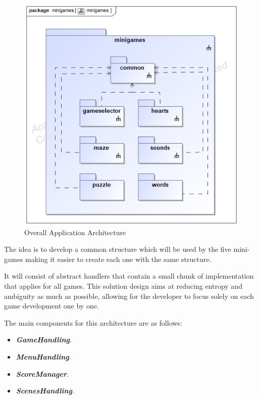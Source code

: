 \begin{figure}[H]
    \centering
    \includegraphics[scale=.5]{Chapters/arq/class__minigames__minigames.jpg}
    \caption{Overall Application Architecture}
    \label{fig:packages}
\end{figure}

The idea is to develop a common structure which will be used by the five mini-games making it easier to create each one with the same structure. 

It will consist of abstract handlers that contain a small chunk of implementation that applies for all games. This solution design aims at reducing entropy and ambiguity as much as possible, allowing for the developer to focus solely on each game development one by one.

The main components for this architecture are as follows:
\begin{itemize}
    \item \textbf{\textit{GameHandling}}.
    \item  \textbf{\textit{MenuHandling}}.
    \item \textbf{\textit{ScoreManager}}.
    \item \textbf{\textit{ScenesHandling}}.
\end{itemize}


